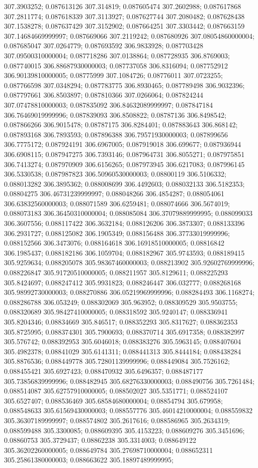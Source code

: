 307.3903252; 0.087613126 307.314819; 0.087605474 307.2602988; 0.087617868 307.2811774; 0.087618339 307.3113927; 0.087627744 307.2080482; 0.087628438 307.1538278; 0.087637429 307.3152902; 0.087664251 307.3303442; 0.087663159 307.14684669999997; 0.087669066 307.2119242; 0.087680926 307.08054860000004; 0.087685047 307.0264779; 0.087693592 306.9833928; 0.087703428 307.09500310000004; 0.087718286 307.0138864; 0.087728935 306.8769003; 0.087740015 306.88687930000003; 0.087737058 306.8316094; 0.087752912 306.90139810000005; 0.08775999 307.1084726; 0.08776011 307.0723255; 0.087766598 307.0348294; 0.087783775 306.8930465; 0.087789498 306.9032396; 0.087797661 306.8503897; 0.087810366 307.0266064; 0.087824244 307.07478810000003; 0.087835092 306.84632089999997; 0.087847184 306.76469019999996; 0.087839093 306.8508822; 0.08787136 306.8498542; 0.087866266 306.9015478; 0.08787175 306.8284401; 0.087883643 306.868142; 0.087893168 306.7893593; 0.087896388 306.79571930000003; 0.087899656 306.7775172; 0.087924191 306.6967005; 0.087919018 306.699677; 0.087936944 306.6908115; 0.087947275 306.7393146; 0.087964731 306.8055271; 0.087975851 306.7413274; 0.087970909 306.6156265; 0.087973945 306.6217083; 0.087996145 306.5330538; 0.087987823 306.50960530000003; 0.08800119 306.5106332; 0.088013282 306.3895362; 0.088008699 306.4492603; 0.088032133 306.5182353; 0.08804275 306.46731239999997; 0.088048266 306.4854287; 0.088054061 306.63832560000003; 0.088071589 306.6259481; 0.088074666 306.5674019; 0.088073183 306.36450310000004; 0.088085084 306.37079889999995; 0.088099033 306.3607556; 0.088117422 306.3632184; 0.088126206 306.3873307; 0.088133396 306.2931727; 0.088125082 306.1905349; 0.088156488 306.37733019999996; 0.088152566 306.3473076; 0.088164618 306.16918510000005; 0.08816842 306.1985437; 0.088182186 306.1059704; 0.088182967 305.9743593; 0.088189415 305.9259634; 0.088205078 305.98367460000003; 0.088213902 305.92602769999996; 0.088226847 305.91720510000005; 0.088211957 305.8129611; 0.088225293 305.8424697; 0.088247412 305.9931823; 0.088246447 306.032777; 0.088268168 305.98992730000003; 0.088270886 306.05219969999996; 0.088284493 306.1168274; 0.088286788 306.053249; 0.088302069 305.963952; 0.088309529 305.9503755; 0.088320689 305.98427410000005; 0.088318592 305.9240147; 0.088336941 305.8204346; 0.08834669 305.846517; 0.088352293 305.8317627; 0.088362353 305.8725995; 0.088374301 305.7900693; 0.088370714 305.6917358; 0.088382997 305.576742; 0.088392953 305.6046018; 0.088383276 305.5963145; 0.088407604 305.4982378; 0.08841029 305.6141311; 0.088441313 305.8444184; 0.088438284 305.8876536; 0.088449778 305.72801139999996; 0.088449084 305.7526162; 0.088455421 305.6927423; 0.088470932 305.6496357; 0.088487177 305.73856839999996; 0.088482945 305.68276330000003; 0.088490756 305.7261484; 0.088514087 305.62757910000005; 0.088502027 305.5351771; 0.088524107 305.6527407; 0.088536469 305.68584680000004; 0.08854794 305.679958; 0.088548633 305.61569430000003; 0.088557776 305.46014210000004; 0.088559832 305.36307189999997; 0.088574802 305.2617616; 0.088586965 305.2634319; 0.088599488 305.3300085; 0.088609395 305.4153223; 0.088609276 305.3451696; 0.08860753 305.3729437; 0.08862238 305.3314003; 0.088649122 305.36202260000005; 0.088649784 305.27698710000004; 0.088652311 305.25861380000003; 0.088663622 305.18897489999995; 